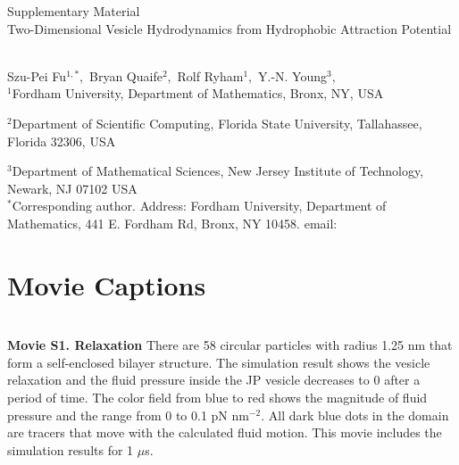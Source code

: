 
\thispagestyle{empty}

\newpage
{\Large \bf

  \noindent Supplementary Material\\

  \noindent 
  Two-Dimensional Vesicle Hydrodynamics from Hydrophobic Attraction Potential}\\

\noindent 
Szu-Pei Fu$^{1,*},$ 
Bryan Quaife$^{2},$ 
Rolf Ryham$^{1},$ 
Y.-N. Young$^{3},$
\\


\noindent
$^{1}$Fordham University, Department of Mathematics,  Bronx, NY, USA

\noindent
$^{2}$Department of Scientific Computing, Florida State University, Tallahassee, Florida 32306, USA

\noindent
$^{3}$Department of Mathematical Sciences, New Jersey Institute of Technology, Newark, NJ  07102 USA
\\

\noindent $^*$Corresponding author. Address: Fordham University, Department of Mathematics, 441 E. Fordham Rd, Bronx, NY 10458. email: 



\setcounter{page}{1}

\setcounter{figure}{0}
\renewcommand{\thefigure}{S\arabic{figure}}

\setcounter{equation}{0}
\renewcommand{\theequation}{S\arabic{equation}}

\setcounter{section}{0}
\renewcommand{\thesection}{S\arabic{section}}   





\sloppy
\section{Movie Captions}\mbox{} \\

\noindent
{\bf Movie S1. Relaxation} There are 58 circular particles with radius 1.25 nm that form a self-enclosed bilayer structure. The simulation result shows the vesicle relaxation and the fluid pressure inside the JP vesicle decreases to 0 after a period of time.
The color field from blue to red shows the magnitude of fluid pressure and the range from 0 to 0.1 pN nm$^{-2}$. All dark blue dots in the domain are tracers that move with the calculated fluid motion.
This movie includes the simulation results for 1 $\mu$s.\\ %



